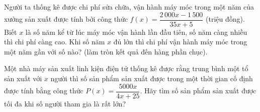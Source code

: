 \begin{bt}%

	Người ta thống kê được chi phí sửa chữa, vận hành máy móc trong một năm của xưởng sản xuất được tính bởi công thức $f(x)=\dfrac{2\,000x-1\,500}{35x+5}$ (triệu đồng). Biết $x$ là số năm kể từ lúc máy móc vận hành lần đầu tiên, số năm càng nhiều thì chi phí càng cao. Khi số năm $x$ đủ lớn thì chi phí vận hành máy móc trong một năm gần với số nào? (làm tròn kết quả đến hàng phần chục).
	
	
\end{bt}

\begin{bt}%

	Một nhà máy sản xuất linh kiện điện tử thống kê được rằng trung bình một tổ sản xuất với $x$ người thì số sản phẩm sản xuất được trong một thời gian cố định được tính bằng công thức $P(x) =\dfrac{ 5 000x}{4x+25}$. Hãy tìm số sản phẩm sản xuất được tối đa khi số người tham gia là rất lớn?
\end{bt}

